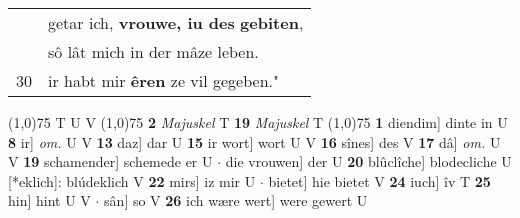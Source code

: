 \documentclass[8pt,a4paper,notitlepage]{article}
\begin{document}
\begin{table}[ht]
\begin{minipage}[t]{0.5\linewidth}
\begin{tabular}{rl}
 & getar ich, \textbf{vrouwe, iu des} \textbf{gebiten},\\ 
 & sô lât mich in der mâze leben.\\ 
30 & ir habt mir \textbf{êren} ze vil gegeben."\\ 
\end{tabular}
\scriptsize
\line(1,0){75} \newline
T U V \newline
\line(1,0){75} \newline
\textbf{2} \textit{Majuskel} T  \textbf{19} \textit{Majuskel} T  \newline
\line(1,0){75} \newline
\textbf{1} diendim] dinte in U \textbf{8} ir] \textit{om.} U V \textbf{13} daz] dar U \textbf{15} ir wort] wort U V \textbf{16} sînes] des V \textbf{17} dâ] \textit{om.} U V \textbf{19} schamender] schemede er U  $\cdot$ die vrouwen] der U \textbf{20} blûclîche] blodecliche U [*eklich]: blúdeklich V \textbf{22} mirs] iz mir U  $\cdot$ bietet] hie bietet V \textbf{24} iuch] îv T \textbf{25} hin] hint U V  $\cdot$ sân] so V \textbf{26} ich wære wert] were gewert U \newline
\end{minipage}
\end{table}
\end{document}
